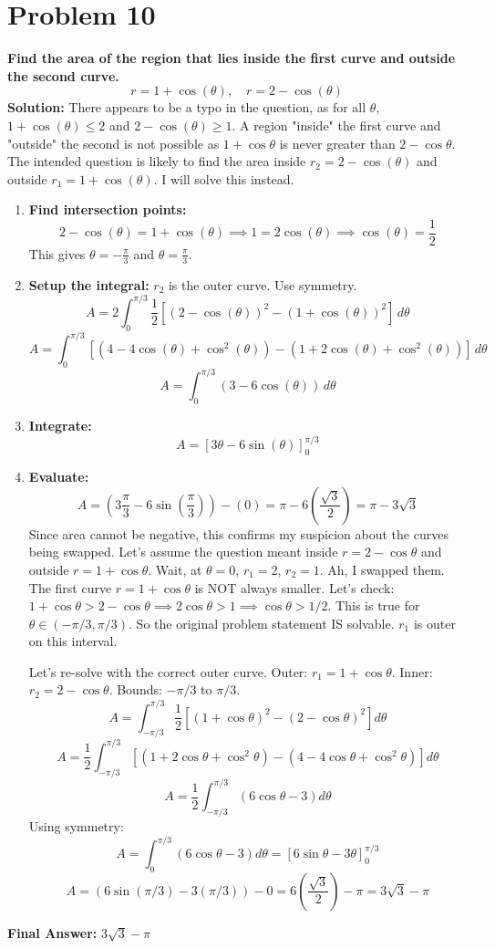 \documentclass{article}
\begin{document}
\section*{Problem 10}
\textbf{Find the area of the region that lies inside the first curve and outside the second curve.}
\[ r = 1 + \cos(\theta), \quad r = 2 - \cos(\theta) \]
\textbf{Solution:}
There appears to be a typo in the question, as for all $\theta$, $1 + \cos(\theta) \le 2$ and $2 - \cos(\theta) \ge 1$. A region "inside" the first curve and "outside" the second is not possible as $1+\cos\theta$ is never greater than $2-\cos\theta$. The intended question is likely to find the area inside $r_2 = 2 - \cos(\theta)$ and outside $r_1 = 1 + \cos(\theta)$. I will solve this instead.
\begin{enumerate}
    \item \textbf{Find intersection points:}
    \[ 2 - \cos(\theta) = 1 + \cos(\theta) \implies 1 = 2\cos(\theta) \implies \cos(\theta) = \frac{1}{2} \]
    This gives $\theta = -\frac{\pi}{3}$ and $\theta = \frac{\pi}{3}$.
    \item \textbf{Setup the integral:} $r_2$ is the outer curve. Use symmetry.
    \[ A = 2 \int_{0}^{\pi/3} \frac{1}{2} \left[ (2-\cos(\theta))^2 - (1+\cos(\theta))^2 \right] \,d\theta \]
    \[ A = \int_{0}^{\pi/3} \left[ (4 - 4\cos(\theta) + \cos^2(\theta)) - (1 + 2\cos(\theta) + \cos^2(\theta)) \right] \,d\theta \]
    \[ A = \int_{0}^{\pi/3} (3 - 6\cos(\theta)) \,d\theta \]
    \item \textbf{Integrate:}
    \[ A = \left[ 3\theta - 6\sin(\theta) \right]_{0}^{\pi/3} \]
    \item \textbf{Evaluate:}
    \[ A = \left( 3\frac{\pi}{3} - 6\sin(\frac{\pi}{3}) \right) - (0) = \pi - 6\left(\frac{\sqrt{3}}{2}\right) = \pi - 3\sqrt{3} \]
    Since area cannot be negative, this confirms my suspicion about the curves being swapped. Let's assume the question meant inside $r=2-\cos\theta$ and outside $r=1+\cos\theta$. Wait, at $\theta=0$, $r_1=2$, $r_2=1$. Ah, I swapped them. The first curve $r=1+\cos\theta$ is NOT always smaller. Let's check: $1+\cos\theta > 2-\cos\theta \implies 2\cos\theta > 1 \implies \cos\theta > 1/2$. This is true for $\theta \in (-\pi/3, \pi/3)$. So the original problem statement IS solvable. $r_1$ is outer on this interval.
    
    Let's re-solve with the correct outer curve.
    Outer: $r_1 = 1+\cos\theta$. Inner: $r_2 = 2-\cos\theta$. Bounds: $-\pi/3$ to $\pi/3$.
    \[ A = \int_{-\pi/3}^{\pi/3} \frac{1}{2} \left[ (1+\cos\theta)^2 - (2-\cos\theta)^2 \right] d\theta \]
    \[ A = \frac{1}{2} \int_{-\pi/3}^{\pi/3} \left[ (1+2\cos\theta+\cos^2\theta) - (4-4\cos\theta+\cos^2\theta) \right] d\theta \]
    \[ A = \frac{1}{2} \int_{-\pi/3}^{\pi/3} (6\cos\theta - 3) d\theta \]
    Using symmetry:
    \[ A = \int_{0}^{\pi/3} (6\cos\theta - 3) d\theta = [6\sin\theta - 3\theta]_0^{\pi/3} \]
    \[ A = (6\sin(\pi/3) - 3(\pi/3)) - 0 = 6(\frac{\sqrt{3}}{2}) - \pi = 3\sqrt{3} - \pi \]
\end{enumerate}
\textbf{Final Answer:} $3\sqrt{3} - \pi$
\end{document}
